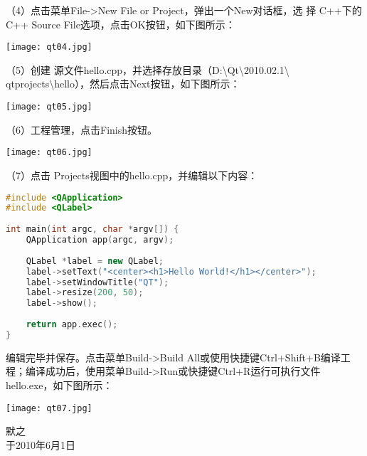 \documentclass[a4paper, 12pt]{article}
\begin{document}
（4）点击菜单File->New File or Project，弹出一个New对话框，选 择 C++下的C++ Source File选项，点击OK按钮，如下图所示：

\begin{center}
  \setlength{\abovecaptionskip}{0pt}    
  \setlength{\belowcaptionskip}{10pt}
  \texttt{[image: qt04.jpg]}
\end{center}

（5）创建 源文件hello.cpp，并选择存放目录（D:\textbackslash Qt\textbackslash 2010.02.1\textbackslash
qtprojects\textbackslash hello），然后点击Next按钮，如下图所示：

\begin{center}
  \setlength{\abovecaptionskip}{0pt}    
  \setlength{\belowcaptionskip}{10pt}
  \texttt{[image: qt05.jpg]}
\end{center}

（6）工程管理，点击Finish按钮。

\begin{center}
  \setlength{\abovecaptionskip}{0pt}    
  \setlength{\belowcaptionskip}{10pt}
  \texttt{[image: qt06.jpg]}
\end{center}

（7）点击 Projects视图中的hello.cpp，并编辑以下内容：

\begin{lstlisting}[language=C++]
#include <QApplication>
#include <QLabel>
 
int main(int argc, char *argv[]) {
    QApplication app(argc, argv);
 
    QLabel *label = new QLabel;
    label->setText("<center><h1>Hello World!</h1></center>");
    label->setWindowTitle("QT");
    label->resize(200, 50);
    label->show();
 
    return app.exec();
}
\end{lstlisting}

编辑完毕并保存。点击菜单Build->Build All或使用快捷键Ctrl+Shift+B编译工程；编译成功后，使用菜单Build->Run或快捷键Ctrl+R运行可执行文件 hello.exe，如下图所示：

\begin{center}
  \setlength{\abovecaptionskip}{0pt}    
  \setlength{\belowcaptionskip}{10pt}
  \texttt{[image: qt07.jpg]}
\end{center}

\begin{flushright}
默之 \\于2010年6月1日
\end{flushright}
\end{document}
